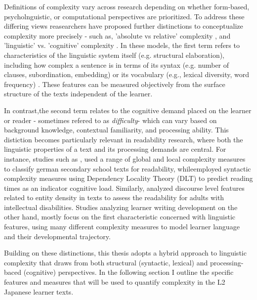 Definitions of complexity vary across research depending on whether form-based, psycholnguistic, or computational
perspectives are prioritized. To address these differing views reasearchers have proposed further distinctions
to conceptualize complexity more precisely - such as, 'absolute vs relative' complexity
\citet{Miestamo2008, Butle2012}, and
'linguistic' vs. 'cognitive' complexity \cite{housen2009}. In these models, the first term refers to characteristics
of the linguistic system itself (e.g. structural elaboration), including how complex a sentence is in terms of its
syntax (e.g. number of clauses, subordination, embedding) or its vocabulary (e.g., lexical diversity, word frequency)
. These features can be measured objectively from the surface structure of the texts independent of the learner.

In contrast,the second term relates to the cognitive demand placed on the learner or reader - sometimes refered to as \emph{difficulty}- which can vary based on background knowledge, contextual familiarity, and processing ability. This distiction becomes particularly relevant in readability research, where both the linguistic properties of a text and its processing demands are central. For instance, studies such as \citet{Berendes2018}, used a range of global and local complexity measures to classify german secondary school texts for readability, while\citet{shain2016}employed syntactic complexity measures using Dependency Locality Theory (DLT) to predict reading times as an indicator cognitive load. Similarly, \citet{Feng2009} analyzed discourse level features related to entity density in texts to assess the readability for adults with intellectual disabilities. Studies analyzing learner writing development on the other hand, mostly focus on the first characteristic concerned with linguistic features, using many different complexity measures to model learner language and their developmental trajectory\cite{Lu2010,Lu2011,Vyatkina2012,weiss2019,Iwashita2006,Wolfe1998, Ortega2003,NorrisOrtega2009}.

Building on these distinctions, this thesis adopts a hybrid approach to linguistic complexity that draws from both
structural (syntactic, lexical) and processing-baced (cognitive) perspectives. In the following section I outline
the specific features and measures that will be used to quantify complexity in the L2 Japanese learner texts.



